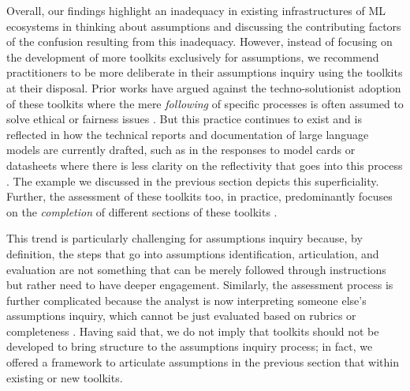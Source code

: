 Overall, our findings highlight an inadequacy in existing infrastructures of ML ecosystems in thinking about assumptions and discussing the contributing factors of the confusion resulting from this inadequacy. 
However, instead of focusing on the development of more toolkits exclusively for assumptions, we recommend practitioners to be more deliberate in their assumptions inquiry using the toolkits at their disposal. Prior works have argued against the techno-solutionist adoption of these toolkits where the mere \textit{following} of specific processes is often assumed to solve ethical or fairness issues \cite{wong2023seeing,balayn2023fairness,dengExploringHowMachine2022,lee2021landscape}. But this practice continues to exist and is reflected in how the technical reports and documentation of large language models are currently drafted, such as in the responses to model cards \cite{mitchellModelCardsModel2019} or datasheets \cite{gebruDatasheetsDatasets2021} where there is less clarity on the reflectivity that goes into this process \cite{wong2023seeing,madaioCoDesigningChecklistsUnderstand2020,crisan2022interactive,bhat2023aspirations}. The example we discussed in the previous section depicts this superficiality. Further, the assessment of these toolkits too, in practice, predominantly focuses  on the \textit{completion} of different sections of these toolkits \cite{liang2024systematic,yang2024navigating}.

This trend is particularly challenging for assumptions inquiry because, by definition, the steps that go into assumptions identification, articulation, and evaluation are not something that can be merely followed through instructions but rather need to have deeper engagement.
Similarly, the assessment process is further complicated because the analyst is now interpreting someone else's assumptions inquiry, which cannot be just evaluated based on rubrics or completeness \cite{govier2010practical,blair2019judging}. 
Having said that, we do not imply that toolkits should not be developed to bring structure to the assumptions inquiry process; in fact,  we offered a framework to articulate assumptions in the previous section that  within existing or new toolkits. 

